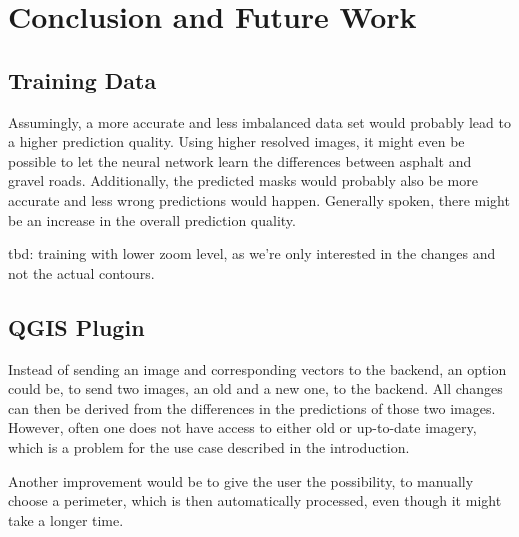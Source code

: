 
\chapter{Conclusion and Future Work}

\section{Training Data}
Assumingly, a more accurate and less imbalanced data set would probably lead to a higher prediction quality. Using higher resolved images, it might even be possible to let the neural network learn the differences between asphalt and gravel roads. Additionally, the predicted masks would probably also be more accurate and less wrong predictions would happen. Generally spoken, there might be an increase in the overall prediction quality.

tbd: training with lower zoom level, as we're only interested in the changes and not the actual contours.

\section{QGIS Plugin}
Instead of sending an image and corresponding vectors to the backend, an option could be, to send two images, an old and a new one, to the backend. All changes can then be derived from the differences in the predictions of those two images. However, often one does not have access to either old or up-to-date imagery,
which is a problem for the use case described in the introduction.

Another improvement would be to give the user the possibility, to manually choose a perimeter, which is then automatically processed, even though it might take a longer time.